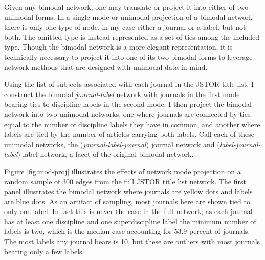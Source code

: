 \documentclass[]{book}
\theoremstyle{definition}
\theoremstyle{definition}
\theoremstyle{definition}
\theoremstyle{remark}
\begin{document}
Given any bimodal network, one may translate or project it into either
of two unimodal forms. In a single mode or unimodal projection of a
bimodal network there is only one type of node, in my case either a
journal or a label, but not both. The omitted type is instead
represented as a set of ties among the included type. Though the bimodal
network is a more elegant representation, it is technically necessary to
project it into one of its two bimodal forms to leverage network methods
that are designed with unimodal data in mind.

Using the list of subjects associated with each journal in the JSTOR
title list, I construct the bimodal \emph{journal-label} network with
journals in the first mode bearing ties to discipline labels in the
second mode. I then project the bimodal network into two unimodal
networks, one where journals are connected by ties equal to the number
of discipline labels they have in common, and another where labels are
tied by the number of articles carrying both labels. Call each of these
unimodal networks, the (\emph{journal-label-journal}) journal network
and (\emph{label-journal-label}) label network, a facet of the original
bimodal network.

Figure \ref{fig:mod-proj} illustrates the effects of network mode
projection on a random sample of 300 edges from the full JSTOR title
list network. The first panel illustrates the bimodal network where
journals are yellow dots and labels are blue dots. As an artifact of
sampling, most journals here are shown tied to only one label. In fact
this is never the case in the full network; as each journal has at least
one discipline and one superdiscipline label the minimum number of
labels is two, which is the median case accounting for 53.9 percent of
journals. The most labels any journal bears is 10, but these are
outliers with most journals bearing only a few labels.
\end{document}
